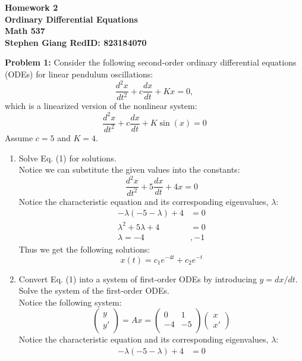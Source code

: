 \documentclass[11pt]{article}
\newenvironment{problem}[1]{\textbf{Problem #1: }}{\newpage}
\begin{document}
	
	\begin{center}
		\textbf{Homework 2} \\
		\textbf{Ordinary Differential Equations} \\
		\textbf{Math 537} \\
		\textbf{Stephen Giang RedID: 823184070} \\
	\end{center}

	\begin{problem}{1}
		Consider the following second-order ordinary differential equations (ODEs) for linear pendulum oscillations:
		\[\frac{d^2x}{dt^2} + c\frac{dx}{dt} + Kx = 0,\tag{1}\]
		which is a linearized version of the nonlinear system:
		\[\frac{d^2x}{dt^2} + c\frac{dx}{dt} + K\sin(x) = 0\]
		Assume $c = 5$ and $K = 4$.
		\begin{enumerate}[label = (\alph*)]
			\item Solve Eq. (1) for solutions. \\
			Notice we can substitute the given values into the constants:
			\[\frac{d^2x}{dt^2} + 5\frac{dx}{dt} + 4x = 0\]
			Notice the characteristic equation and its corresponding eigenvalues, $\lambda$:
			\begin{align*}
			-\lambda (-5 - \lambda) + 4 &= 0 \\
			\lambda^2 + 5\lambda + 4 &= 0 \\
			\lambda = -4&,-1
			\end{align*}
			Thus we get the following solutions:
			\[ x(t) = c_1e^{-4t} + c_2e^{-t}\]
			\item Convert Eq. (1) into a system of first-order ODEs by introducing $y =
			dx/dt$. Solve the system of the first-order ODEs.
\\
			Notice the following system:
			\[ \begin{pmatrix}
				y \\
				y'
			\end{pmatrix} = Ax = 
			\begin{pmatrix}
				0 & 1 \\
				-4 & -5\\
			\end{pmatrix}
			\begin{pmatrix}
				x \\
				x'
			\end{pmatrix} \]
			Notice the characteristic equation and its corresponding eigenvalues, $\lambda$:
			\begin{align*}
				-\lambda (-5 - \lambda) + 4 &= 0 \\

\end{align*}
\end{enumerate}
\end{problem}
\end{document}
